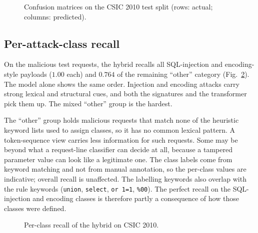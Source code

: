 \documentclass[preprint,11pt]{elsarticle}
\let\footnotesize\normalsize
\begin{document}
\begin{figure}[t]
\centering
{}
\caption{Confusion matrices on the CSIC 2010 test split (rows: actual; columns: predicted).}
\label{fig:cm}
\end{figure}

\subsection{Per-attack-class recall}
On the malicious test requests, the hybrid recalls all SQL-injection and
encoding-style payloads ($1.00$ each) and $0.764$ of the remaining
``other'' category (Fig.~\ref{fig:perclass}). The model alone shows the
same order. Injection and encoding attacks carry strong lexical and
structural cues, and both the signatures and the transformer pick them up.
The mixed ``other'' group is the hardest.

The ``other'' group holds malicious requests that match none of the
heuristic keyword lists used to assign classes, so it has no common lexical
pattern. A token-sequence view carries less information for such requests.
Some may be beyond what a request-line classifier can decide at all,
because a tampered parameter value can look like a legitimate one. The
class labels come from keyword matching and not from manual annotation, so
the per-class values are indicative; overall recall is unaffected. The
labelling keywords also overlap with the rule keywords (\texttt{union},
\texttt{select}, \texttt{or 1=1}, \texttt{\%00}). The perfect recall on the
SQL-injection and encoding classes is therefore partly a consequence of how
those classes were defined.

\begin{figure}[t]
\centering
{}
\caption{Per-class recall of the hybrid on CSIC 2010.}
\label{fig:perclass}
\end{figure}
\end{document}
